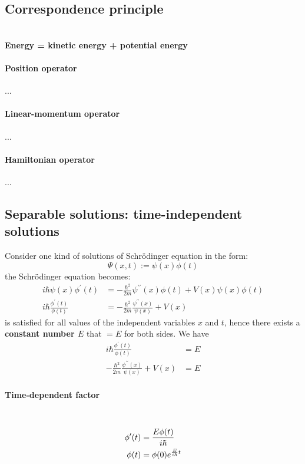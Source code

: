 \subsection{Correspondence principle}
\\
\textbf{Energy = kinetic energy + potential energy}

\paragraph{Position operator}
...

\paragraph{Linear-momentum operator}
...

\paragraph{Hamiltonian operator}
...

\subsection{Separable solutions: time-independent solutions}
Consider one kind of solutions of Schrödinger equation in the form:
$$
    \Psi(x, t):= \psi(x) \phi(t)
$$
the Schrödinger equation becomes:
\begin{align}
    i \hbar \psi(x) \phi^{\prime}(t)         & =-\frac{\hbar^{2}}{2 m} \psi^{\prime \prime}(x) \phi(t)+V(x) \psi(x) \phi(t)    \\
    i \hbar \frac{\phi^{\prime}(t)}{\phi(t)} & =-\frac{\hbar^{2}}{2 m} \frac{\psi^{\prime \prime}(x)}{\psi(x)}+V(x)\label{eq7}
\end{align}
 is satisfied for all values of the independent variables $x$ and $t$, hence there exists a \textbf{constant number $E$} that  $=E$ for both sides. We have
\begin{align}
    i \hbar \frac{\phi^{\prime}(t)}{\phi(t)}                            & =E \label{eq8} \\
    -\frac{\hbar^{2}}{2 m} \frac{\psi^{\prime \prime}(x)}{\psi(x)}+V(x) & =E\label{eq9}
\end{align}
\paragraph{Time-dependent factor }~{}
\begin{align}
    \phi^{\prime}(t) &= \frac{E \phi(t)}{i\hbar}\notag\\
    \phi(t) &= \phi(0)e^{\frac{E}{i\hbar}t} \label{eq10}
\end{align}

